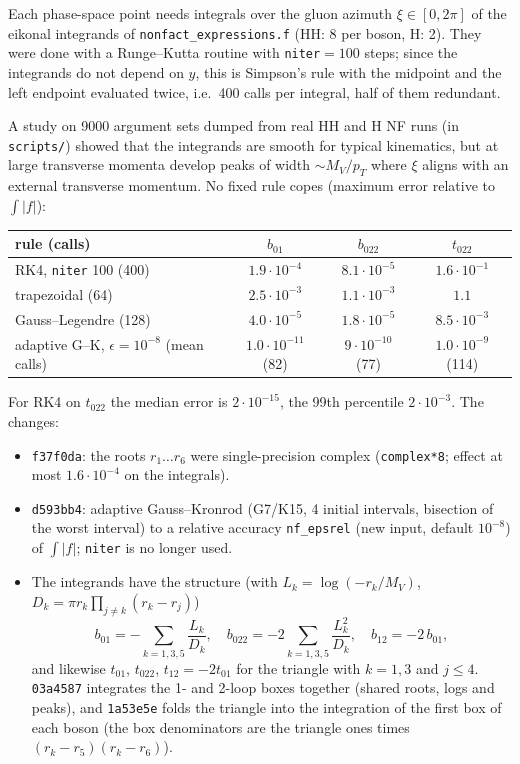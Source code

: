 \documentclass[11pt,a4paper]{article}
\newcommand{\commit}[1]{\texttt{#1}}
\newcommand{\file}[1]{\texttt{#1}}
\newcommand{\MV}{M_V}
\begin{document}
Each phase-space point needs integrals over the gluon azimuth
$\xi\in[0,2\pi]$ of the eikonal integrands of
\file{nonfact\_expressions.f} (HH: 8 per boson, H: 2). They were done
with a Runge--Kutta routine with \texttt{niter}${}=100$ steps; since
the integrands do not depend on $y$, this is Simpson's rule with the
midpoint and the left endpoint evaluated twice, i.e.\ 400 calls per
integral, half of them redundant.

A study on 9000 argument sets dumped from real HH and H NF runs
(in \file{scripts/}) showed that the integrands are smooth
for typical kinematics, but at large transverse momenta develop peaks
of width $\sim\MV/p_T$ where $\xi$ aligns with an external transverse
momentum. No fixed rule copes (maximum error relative to $\int|f|$):

\begin{center}
\small\setlength{\tabcolsep}{4pt}
\begin{tabular}{lccc}
\toprule
rule (calls) & $b_{01}$ & $b_{022}$ & $t_{022}$\\
\midrule
RK4, \texttt{niter} 100 (400) & $1.9\cdot10^{-4}$ & $8.1\cdot10^{-5}$ & $1.6\cdot10^{-1}$\\
trapezoidal (64) & $2.5\cdot10^{-3}$ & $1.1\cdot10^{-3}$ & $1.1$\\
Gauss--Legendre (128) & $4.0\cdot10^{-5}$ & $1.8\cdot10^{-5}$ & $8.5\cdot10^{-3}$\\
adaptive G--K, $\epsilon=10^{-8}$ (mean calls) & $1.0\cdot10^{-11}$ (82) & $9\cdot10^{-10}$ (77) & $1.0\cdot10^{-9}$ (114)\\
\bottomrule
\end{tabular}
\end{center}

\noindent For RK4 on $t_{022}$ the median error is $2\cdot10^{-15}$,
the 99th percentile $2\cdot10^{-3}$. The changes:
\begin{itemize}
\item \commit{f37f0da}: the roots $r_1\ldots r_6$ were single-precision
  complex (\texttt{complex*8}; effect at most $1.6\cdot10^{-4}$ on the
  integrals).
\item \commit{d593bb4}: adaptive Gauss--Kronrod (G7/K15, 4 initial
  intervals, bisection of the worst interval) to a relative accuracy
  \texttt{nf\_epsrel} (new input, default $10^{-8}$) of $\int|f|$;
  \texttt{niter} is no longer used.
\item The integrands have the structure (with
  $L_k=\log(-r_k/\MV)$, $D_k=\pi r_k\prod_{j\ne k}(r_k-r_j)$)
  \begin{equation}
    b_{01}=-\sum_{k=1,3,5}\frac{L_k}{D_k},\quad
    b_{022}=-2\sum_{k=1,3,5}\frac{L_k^2}{D_k},\quad
    b_{12}=-2\,b_{01},
  \end{equation}
  and likewise $t_{01}$, $t_{022}$, $t_{12}=-2t_{01}$ for the triangle
  with $k=1,3$ and $j\le4$. \commit{03a4587} integrates the 1- and
  2-loop boxes together (shared roots, logs and peaks), and
  \commit{1a53e5e} folds the triangle into the integration of the first
  box of each boson (the box denominators are the triangle ones times
  $(r_k-r_5)(r_k-r_6)$).
\end{itemize}
\end{document}
